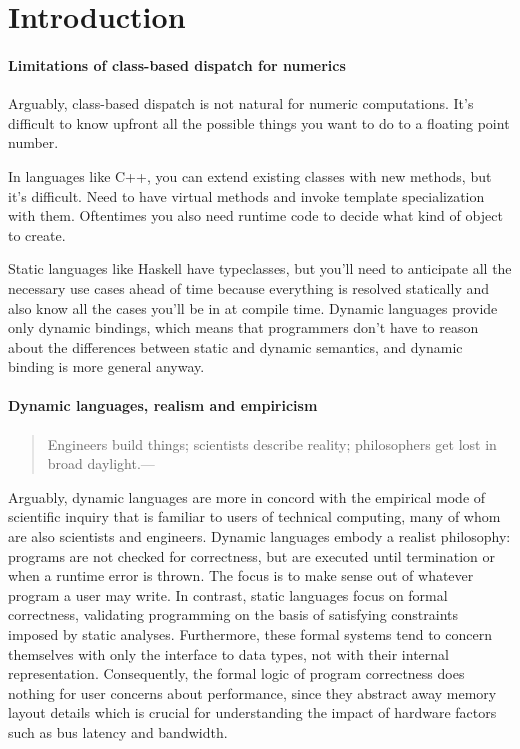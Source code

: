 \section{Introduction}

\paragraph{Limitations of class-based dispatch for numerics} %

Arguably, class-based dispatch is not natural for numeric computations. It's difficult to know upfront all the possible things you want to do to a floating point number.

In languages like C++, you can extend existing classes with new methods, but it's difficult. Need to have virtual methods and invoke template specialization with them. Oftentimes you also need runtime code to decide what kind of object to create.

Static languages like Haskell have typeclasses\cite{typeclass}, but you'll need to anticipate all the necessary use cases ahead of time because everything is resolved statically and also know all the cases you'll be in at compile time. Dynamic languages provide only dynamic bindings,  which means that programmers don't have to reason about the differences between static and dynamic semantics, and dynamic binding is more general anyway.

\paragraph{Dynamic languages, realism and empiricism}

\begin{quote}
Engineers build things; scientists describe reality; philosophers get lost in broad daylight.---\cite{Gabriel2012}
\end{quote}

Arguably, dynamic languages are more in concord with the empirical mode of scientific inquiry that is familiar to users of technical computing, many of whom are also scientists and engineers. Dynamic languages embody a realist philosophy: programs are not checked for correctness, but are executed until termination or when a runtime error is thrown. The focus is to make sense out of whatever program a user may write. In contrast, static languages focus on formal correctness, validating programming on the basis of satisfying constraints imposed by static analyses. Furthermore, these formal systems tend to concern themselves with only the interface to data types, not with their internal representation. Consequently, the formal logic of program correctness does nothing for user concerns about performance, since they abstract away memory layout details which is crucial for understanding the impact of hardware factors such as bus latency and bandwidth.

